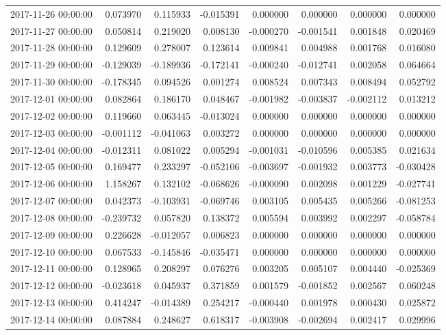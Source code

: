 \begin{tabular}{lrrrrrrr}
2017-11-26 00:00:00 & 0.073970 & 0.115933 & -0.015391 & 0.000000 & 0.000000 & 0.000000 & 0.000000 \\
2017-11-27 00:00:00 & 0.050814 & 0.219020 & 0.008130 & -0.000270 & -0.001541 & 0.001848 & 0.020469 \\
2017-11-28 00:00:00 & 0.129609 & 0.278007 & 0.123614 & 0.009841 & 0.004988 & 0.001768 & 0.016080 \\
2017-11-29 00:00:00 & -0.129039 & -0.189936 & -0.172141 & -0.000240 & -0.012741 & 0.002058 & 0.064664 \\
2017-11-30 00:00:00 & -0.178345 & 0.094526 & 0.001274 & 0.008524 & 0.007343 & 0.008494 & 0.052792 \\
2017-12-01 00:00:00 & 0.082864 & 0.186170 & 0.048467 & -0.001982 & -0.003837 & -0.002112 & 0.013212 \\
2017-12-02 00:00:00 & 0.119660 & 0.063445 & -0.013024 & 0.000000 & 0.000000 & 0.000000 & 0.000000 \\
2017-12-03 00:00:00 & -0.001112 & -0.041063 & 0.003272 & 0.000000 & 0.000000 & 0.000000 & 0.000000 \\
2017-12-04 00:00:00 & -0.012311 & 0.081022 & 0.005294 & -0.001031 & -0.010596 & 0.005385 & 0.021634 \\
2017-12-05 00:00:00 & 0.169477 & 0.233297 & -0.052106 & -0.003697 & -0.001932 & 0.003773 & -0.030428 \\
2017-12-06 00:00:00 & 1.158267 & 0.132102 & -0.068626 & -0.000090 & 0.002098 & 0.001229 & -0.027741 \\
2017-12-07 00:00:00 & 0.042373 & -0.103931 & -0.069746 & 0.003105 & 0.005435 & 0.005266 & -0.081253 \\
2017-12-08 00:00:00 & -0.239732 & 0.057820 & 0.138372 & 0.005594 & 0.003992 & 0.002297 & -0.058784 \\
2017-12-09 00:00:00 & 0.226628 & -0.012057 & 0.006823 & 0.000000 & 0.000000 & 0.000000 & 0.000000 \\
2017-12-10 00:00:00 & 0.067533 & -0.145846 & -0.035471 & 0.000000 & 0.000000 & 0.000000 & 0.000000 \\
2017-12-11 00:00:00 & 0.128965 & 0.208297 & 0.076276 & 0.003205 & 0.005107 & 0.004440 & -0.025369 \\
2017-12-12 00:00:00 & -0.023618 & 0.045937 & 0.371859 & 0.001579 & -0.001852 & 0.002567 & 0.060248 \\
2017-12-13 00:00:00 & 0.414247 & -0.014389 & 0.254217 & -0.000440 & 0.001978 & 0.000430 & 0.025872 \\
2017-12-14 00:00:00 & 0.087884 & 0.248627 & 0.618317 & -0.003908 & -0.002694 & 0.002417 & 0.029996 \\

\end{tabular}

